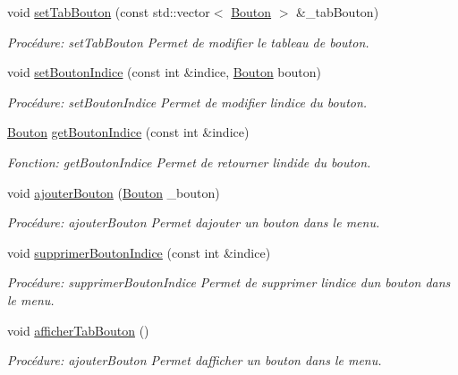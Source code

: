 \begin{DoxyCompactItemize}
void \hyperlink{classMenu_a45b3fe1a4d7cca82acabd3102d8bfd7c}{set\+Tab\+Bouton} (const std\+::vector$<$ \hyperlink{classBouton}{Bouton} $>$ \&\+\_\+tab\+Bouton)
\begin{DoxyCompactList}\small\item\em Procédure\+: set\+Tab\+Bouton Permet de modifier le tableau de bouton. \end{DoxyCompactList}\item 
void \hyperlink{classMenu_acedbb44af6fcc981aef033a585df2169}{set\+Bouton\+Indice} (const int \&indice, \hyperlink{classBouton}{Bouton} bouton)
\begin{DoxyCompactList}\small\item\em Procédure\+: set\+Bouton\+Indice Permet de modifier l\textquotesingle{}indice du bouton\textquotesingle{}. \end{DoxyCompactList}\item 
\hyperlink{classBouton}{Bouton} \hyperlink{classMenu_a16bc4dffec20a0ce177f189f9c711e09}{get\+Bouton\+Indice} (const int \&indice)
\begin{DoxyCompactList}\small\item\em Fonction\+: get\+Bouton\+Indice Permet de retourner l\textquotesingle{}indide du bouton. \end{DoxyCompactList}\item 
void \hyperlink{classMenu_a429b2c8fcaed081553ce284ffa0637ab}{ajouter\+Bouton} (\hyperlink{classBouton}{Bouton} \+\_\+bouton)
\begin{DoxyCompactList}\small\item\em Procédure\+: ajouter\+Bouton Permet d\textquotesingle{}ajouter un bouton dans le menu. \end{DoxyCompactList}\item 
void \hyperlink{classMenu_a1ed5172963be698f6fbabcf5a87ff664}{supprimer\+Bouton\+Indice} (const int \&indice)
\begin{DoxyCompactList}\small\item\em Procédure\+: supprimer\+Bouton\+Indice Permet de supprimer l\textquotesingle{}indice d\textquotesingle{}un bouton dans le menu. \end{DoxyCompactList}\item 
void \hyperlink{classMenu_af01f5f26519658b6e0fd92fdb8eda6fe}{afficher\+Tab\+Bouton} ()
\begin{DoxyCompactList}\small\item\em Procédure\+: ajouter\+Bouton Permet d\textquotesingle{}afficher\textquotesingle{} un bouton dans le menu. \end{DoxyCompactList}\end{DoxyCompactItemize}


